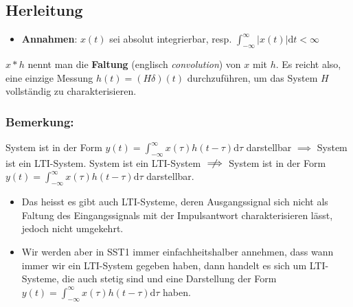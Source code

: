 \documentclass[11pt]{article}
\begin{document}
\vfill \null
\pagebreak

\vspace*{-0.5cm}
\subsection*{Herleitung}
\vspace*{-0.5cm}
\begin{itemize}[leftmargin=0pt]
    \item[] \textbf{Annahmen}: $x(t)$ sei absolut integrierbar, resp. $\displaystyle \int_{-\infty}^\infty |x(t)|\text{d}t < \infty$
\end{itemize}

\vspace*{-0.5cm}


\vfill \null
\pagebreak

%

$x \ast h$ nennt man die \textbf{Faltung} (englisch \textit{convolution}) von $x$ mit $h$. Es reicht also, eine einzige Messung $h(t) = (H \delta)(t)$ durchzuführen, um das System $H$ vollständig zu charakterisieren.

\vspace*{-0.5cm}
\subsubsection*{Bemerkung:}
\vspace*{-0.5cm}
System ist in der Form $y(t) = \displaystyle\int_{-\infty}^{\infty} x(\tau) h(t-\tau) \text{d}\tau$ darstellbar $\implies$ System ist ein LTI-System.
System ist ein LTI-System $\centernot{\implies}$ System ist in der Form $y(t) = \displaystyle\int_{-\infty}^{\infty} x(\tau) h(t-\tau) \text{d}\tau$ darstellbar.
\vspace*{-0.5cm}
\begin{itemize}[leftmargin=0pt]
    \item[] Das heisst es gibt auch LTI-Systeme, deren Ausgangssignal sich nicht als Faltung des Eingangssignals mit der Impulsantwort charakterisieren lässt, jedoch nicht umgekehrt.
    \item[] Wir werden aber in SST1 immer einfachheitshalber annehmen, dass wann immer wir ein LTI-System gegeben haben, dann handelt es sich um LTI-Systeme, die auch stetig sind und eine Darstellung der Form $y(t) = \displaystyle\int_{-\infty}^{\infty} x(\tau) h(t-\tau) \text{d}\tau$ haben.
\end{itemize}
\end{document}
